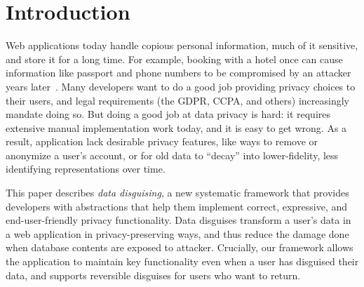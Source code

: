\section{Introduction}
\label{s:intro}

%
Web applications today handle copious personal information, much of it
sensitive, and store it for a long time.
%
For example, booking with a hotel once can cause information like passport
and phone numbers to be compromised by an attacker years
later~\cite{starwood-hack}.
%
%
Many developers want to do a good job providing privacy choices to their users,
and legal requirements (\eg the GDPR, CCPA, and others) increasingly mandate
doing so.
%
%
But doing a good job at data privacy is hard: it requires extensive manual
implementation work today, and it is easy to get wrong.
%
As a result, application lack desirable privacy features, like \eg ways to
remove or anonymize a user's account, or for old data to ``decay'' into
lower-fidelity, less identifying representations over time.
%

%
%

%
This paper describes \emph{data disguising}, a new systematic framework that
provides developers with abstractions that help them implement correct,
expressive, and end-user-friendly privacy functionality.
%
Data disguises transform a user's data in a web application in
privacy-preserving ways, and thus reduce the damage done when database contents
are exposed to attacker.
%
Crucially, our framework allows the application to maintain key functionality even
when a user has disguised their data, and supports reversible disguises for users
who want to return.
%

